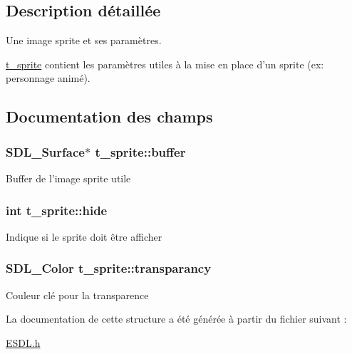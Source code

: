 \subsection{Description détaillée}
Une image sprite et ses paramètres. 

\hyperlink{structt__sprite}{t\+\_\+sprite} contient les paramètres utiles à la mise en place d'un sprite (ex\+: personnage animé). 

\subsection{Documentation des champs}
\hypertarget{structt__sprite_a7bf667c8102b5eedf01ce17e1094f62a}{
\subsubsection[{buffer}]{\setlength{\rightskip}{0pt plus 5cm}S\+D\+L\+\_\+\+Surface$\ast$ t\+\_\+sprite\+::buffer}}\label{structt__sprite_a7bf667c8102b5eedf01ce17e1094f62a}
Buffer de l'image sprite utile \hypertarget{structt__sprite_acac6e6019ee568825e9c30561d555037}{
\subsubsection[{hide}]{\setlength{\rightskip}{0pt plus 5cm}int t\+\_\+sprite\+::hide}}\label{structt__sprite_acac6e6019ee568825e9c30561d555037}
Indique si le sprite doit être afficher \hypertarget{structt__sprite_af47a36836cb7712c252e31161e388ce1}{
\subsubsection[{transparancy}]{\setlength{\rightskip}{0pt plus 5cm}S\+D\+L\+\_\+\+Color t\+\_\+sprite\+::transparancy}}\label{structt__sprite_af47a36836cb7712c252e31161e388ce1}
Couleur clé pour la transparence 

La documentation de cette structure a été générée à partir du fichier suivant \+:\begin{DoxyCompactItemize}
\item 
\hyperlink{_e_s_d_l_8h}{E\+S\+D\+L.\+h}\end{DoxyCompactItemize}
